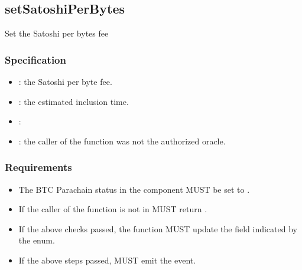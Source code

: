 \documentclass[a4paper,10pt,english]{sphinxmanual}
\begin{document}
\subsection{setSatoshiPerBytes}
\label{\detokenize{spec/oracle:setsatoshiperbytes}}\label{\detokenize{spec/oracle:id2}}
Set the Satoshi per bytes fee


\subsubsection{Specification}
\label{\detokenize{spec/oracle:id3}}


\begin{itemize}
\item {} 
: the Satoshi per byte fee.

\item {} 
: the estimated inclusion time.

\end{itemize}

\begin{itemize}
\item {} 
:

\end{itemize}

\begin{itemize}
\item {} 
: the caller of the function was not the authorized oracle.

\end{itemize}


\subsubsection{Requirements}
\label{\detokenize{spec/oracle:requirements}}\begin{itemize}
\item {} 
The BTC Parachain status in the {\hyperref[\detokenize{spec/security:security}]{}} component MUST be set to .

\item {} 
If the caller of the function is not in  MUST return .

\item {} 
If the above checks passed, the function MUST update the  field indicated by the  enum.

\item {} 
If the above steps passed, MUST emit the  event.

\end{itemize}
\end{document}
